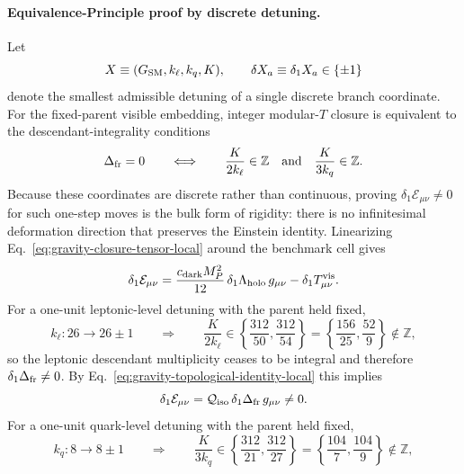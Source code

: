 \documentclass[11pt]{article}
\begin{document}
\paragraph{Equivalence-Principle proof by discrete detuning.}
Let
\begin{equation}
\label{eq:gravity-discrete-coordinate-vector}
 X\equiv(G_{\rm SM},k_{\ell},k_q,K),
 \qquad
 \delta X_a\equiv\delta_1 X_a\in\{\pm1\}
\end{equation}
 denote the smallest admissible detuning of a single discrete branch coordinate.
For the fixed-parent visible embedding, integer modular-$T$ closure is
equivalent to the descendant-integrality conditions
\begin{equation}
\label{eq:gravity-discrete-branch-integrality}
 \Delta_{\rm fr}=0
 \qquad\Longleftrightarrow\qquad
 \frac{K}{2k_{\ell}}\in\mathbb Z
 \quad\text{and}\quad
 \frac{K}{3k_q}\in\mathbb Z.
\end{equation}
Because these coordinates are discrete rather than continuous, proving
$\delta_1\mathcal E_{\mu\nu}\neq0$ for such one-step moves is the bulk form of
rigidity: there is no infinitesimal deformation direction that preserves the
Einstein identity.
Linearizing Eq.~\eqref{eq:gravity-closure-tensor-local} around the benchmark
cell gives
\begin{equation}
\label{eq:gravity-discrete-closure-variation}
 \delta_1\mathcal E_{\mu\nu}
 =
 \frac{c_{\rm dark}M_P^2}{12}\,\delta_1\Lambda_{\rm holo}\,g_{\mu\nu}
 -\delta_1 T^{\rm vis}_{\mu\nu}.
\end{equation}
For a one-unit leptonic-level detuning with the parent held fixed,
\begin{equation}
\label{eq:gravity-kl-unit-detuning}
 k_{\ell}:26\to26\pm1
 \qquad\Longrightarrow\qquad
 \frac{K}{2k_{\ell}}
 \in
 \left\{\frac{312}{50},\frac{312}{54}\right\}
 =
 \left\{\frac{156}{25},\frac{52}{9}\right\}
 \notin\mathbb Z,
\end{equation}
so the leptonic descendant multiplicity ceases to be integral and therefore
$\delta_1\Delta_{\rm fr}\neq0$. By Eq.~\eqref{eq:gravity-topological-identity-local}
this implies
\begin{equation}
\label{eq:gravity-kl-detuning-nonzero-closure}
 \delta_1\mathcal E_{\mu\nu}
 =
 \mathcal Q_{\rm iso}\,\delta_1\Delta_{\rm fr}\,g_{\mu\nu}
 \neq0.
\end{equation}
For a one-unit quark-level detuning with the parent held fixed,
\begin{equation}
\label{eq:gravity-kq-unit-detuning}
 k_q:8\to8\pm1
 \qquad\Longrightarrow\qquad
 \frac{K}{3k_q}
 \in
 \left\{\frac{312}{21},\frac{312}{27}\right\}
 =
 \left\{\frac{104}{7},\frac{104}{9}\right\}
 \notin\mathbb Z,
\end{equation}
\end{document}

